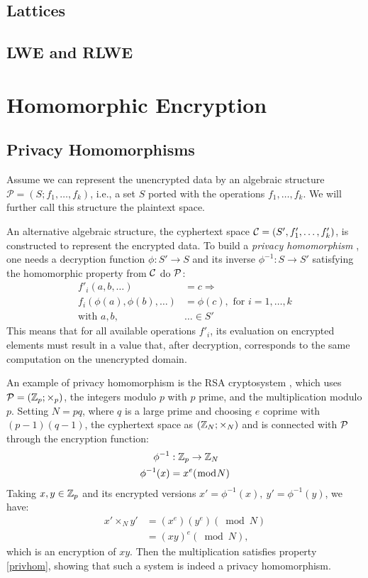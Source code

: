 \section{Lattices}

\section{LWE and RLWE}

\chapter{Homomorphic Encryption}

\section{Privacy Homomorphisms}

Assume we can represent the unencrypted data by an algebraic structure $\mathcal P= (S;f_1,\ldots,f_k)$, i.e., a set $S$ ported with the operations $f_1,\ldots,f_k$. We will further call this structure the plaintext space.

An alternative algebraic structure, the cyphertext space $\mathcal C=(S',f'_1,\ldots,f'_k)$, is constructed to represent the encrypted data. To build a \textit{privacy homomorphism} \cite{Rivest1978},  one needs a decryption function $\phi:S'\to S$ and its inverse $\phi^{-1}:S\to S'$ satisfying the homomorphic property from $\mathcal C$ do $\mathcal P$:
\begin{align}
    \label{privhom}
    f'_i(a,b,\ldots)&=c\Rightarrow\nonumber\\ f_i(\phi(a),\phi(b),\ldots)&=\phi(c),\text{ for } i=1,\ldots,k\\
    \text{with }a,b,&\ldots\in S'\nonumber
\end{align}
This means that for all available operations $f'_i$, its evaluation on encrypted elements must result in a value that, after decryption, corresponds to the same computation on the unencrypted domain.

An example of privacy homomorphism is the RSA cryptosystem \cite{rsa}, which uses $\mathcal P = (\mathbb{Z}_p;\times_p)$, the integers modulo $p$ with $p$ prime, and the multiplication modulo $p$. Setting $N=pq$, where $q$ is a large prime and choosing $e$ coprime with $(p-1)(q-1)$,  the cyphertext space as $(\mathbb{Z}_N;\times_N)$ and is connected with $\mathcal P$ through the encryption function:
\begin{align*}
    \phi^{-1}&:\mathbb{Z}_p\to\mathbb{Z}_N\\
    \phi^{-1}(x)&=x^e(\bmod N)
\end{align*}
Taking $x,y\in\mathbb{Z}_p$ and its encrypted versions $x'=\phi^{-1}(x),~y'=\phi^{-1}(y)$, we have:
\begin{align*}
    x'\times_N y'&= (x^e)(y^e)(\bmod N)\\
    &=(xy)^e(\bmod N),
\end{align*}
which is an encryption of $xy$. Then the multiplication satisfies property \ref{privhom}, showing that such a system is indeed a privacy homomorphism.

